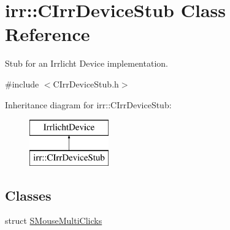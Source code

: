\hypertarget{classirr_1_1_c_irr_device_stub}{\section{irr\-:\-:C\-Irr\-Device\-Stub Class Reference}
\label{classirr_1_1_c_irr_device_stub}
}


Stub for an Irrlicht Device implementation.  




{\ttfamily \#include $<$C\-Irr\-Device\-Stub.\-h$>$}

Inheritance diagram for irr\-:\-:C\-Irr\-Device\-Stub\-:\begin{figure}[H]
\begin{center}
\leavevmode
\includegraphics[height=2.000000cm]{classirr_1_1_c_irr_device_stub}
\end{center}
\end{figure}
\subsection*{Classes}
\begin{DoxyCompactItemize}
\item 
struct \hyperlink{structirr_1_1_c_irr_device_stub_1_1_s_mouse_multi_clicks}{S\-Mouse\-Multi\-Clicks}
\end{DoxyCompactItemize}
